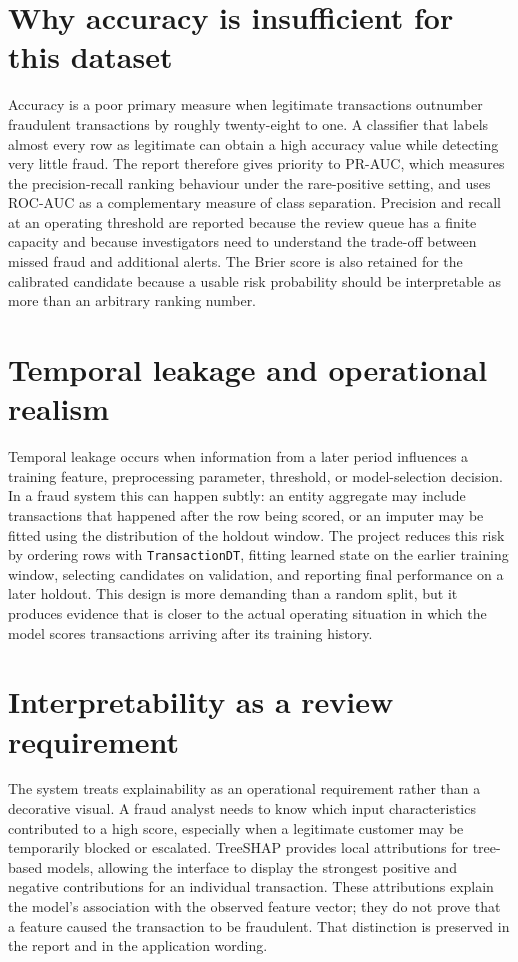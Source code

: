 \section{Why accuracy is insufficient for this dataset}

Accuracy is a poor primary measure when legitimate transactions outnumber
fraudulent transactions by roughly twenty-eight to one. A classifier that labels
almost every row as legitimate can obtain a high accuracy value while detecting
very little fraud. The report therefore gives priority to PR-AUC, which measures
the precision-recall ranking behaviour under the rare-positive setting, and
uses ROC-AUC as a complementary measure of class separation. Precision and
recall at an operating threshold are reported because the review queue has a
finite capacity and because investigators need to understand the trade-off
between missed fraud and additional alerts. The Brier score is also retained
for the calibrated candidate because a usable risk probability should be
interpretable as more than an arbitrary ranking number.

\section{Temporal leakage and operational realism}

Temporal leakage occurs when information from a later period influences a
training feature, preprocessing parameter, threshold, or model-selection
decision. In a fraud system this can happen subtly: an entity aggregate may
include transactions that happened after the row being scored, or an imputer
may be fitted using the distribution of the holdout window. The project reduces
this risk by ordering rows with \texttt{TransactionDT}, fitting learned state
on the earlier training window, selecting candidates on validation, and
reporting final performance on a later holdout. This design is more demanding
than a random split, but it produces evidence that is closer to the actual
operating situation in which the model scores transactions arriving after its
training history.

\section{Interpretability as a review requirement}

The system treats explainability as an operational requirement rather than a
decorative visual. A fraud analyst needs to know which input characteristics
contributed to a high score, especially when a legitimate customer may be
temporarily blocked or escalated. TreeSHAP provides local attributions for
tree-based models, allowing the interface to display the strongest positive
and negative contributions for an individual transaction. These attributions
explain the model's association with the observed feature vector; they do not
prove that a feature caused the transaction to be fraudulent. That distinction
is preserved in the report and in the application wording.
